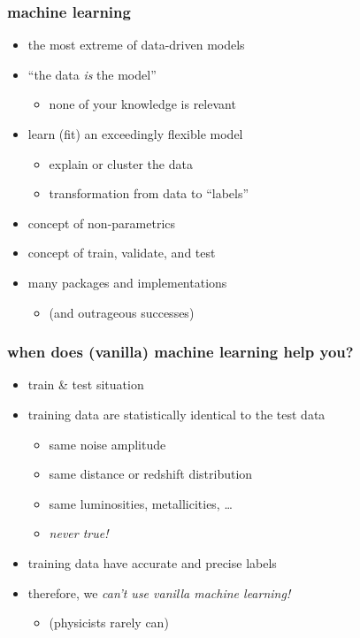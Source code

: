 \documentclass[pdftex]{beamer}
\begin{document}
\begin{frame}
  \frametitle{machine learning}
  \begin{itemize}
  \item the most extreme of data-driven models
  \item ``the data \emph{is} the model''
    \begin{itemize}
    \item none of your knowledge is relevant
    \end{itemize}
  \item learn (fit) an exceedingly flexible model
    \begin{itemize}
    \item explain or cluster the data
    \item transformation from data to ``labels''
    \end{itemize}
  \item concept of non-parametrics
  \item concept of train, validate, and test
  \item many packages and implementations
    \begin{itemize}
    \item (and outrageous successes)
    \end{itemize}
  \end{itemize}
\end{frame}

\begin{frame}
  \frametitle{when does (vanilla) machine learning help you?}
  \begin{itemize}
  \item train \& test situation
  \item training data are statistically identical to the test data
    \begin{itemize}
    \item same noise amplitude
    \item same distance or redshift distribution
    \item same luminosities, metallicities, \ldots
    \item \emph{never true!}
    \end{itemize}
  \item training data have accurate and precise labels
  \item therefore, we \emph{can't use vanilla machine learning!}
    \begin{itemize}
    \item (physicists rarely can)
    \end{itemize}
  \end{itemize}
\end{frame}
\end{document}

